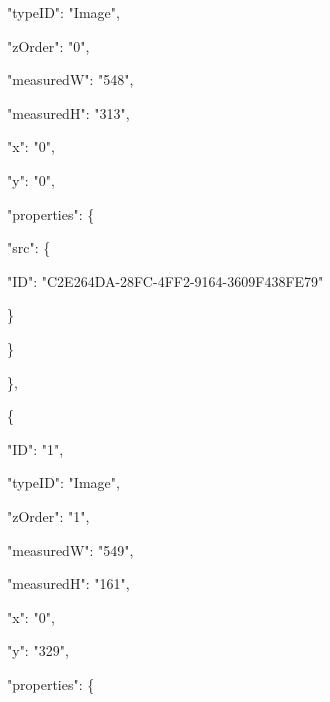 \documentclass[13pt]{article}
\begin{document}
{\raggedright
{\footnotesize                                     "typeID": "Image",}
}

{\raggedright
{\footnotesize                                     "zOrder": "0",}
}

{\raggedright
{\footnotesize                                     "measuredW": "548",}
}

{\raggedright
{\footnotesize                                     "measuredH": "313",}
}

{\raggedright
{\footnotesize                                     "x": "0",}
}

{\raggedright
{\footnotesize                                     "y": "0",}
}

{\raggedright
{\footnotesize                                     "properties": \{}
}

{\raggedright
{\footnotesize                                         "src": \{}
}

{\raggedright
{\footnotesize                                             "ID":
"C2E264DA-28FC-4FF2-9164-3609F438FE79"}
}

{\raggedright
{\footnotesize                                         \}}
}

{\raggedright
{\footnotesize                                     \}}
}

{\raggedright
{\footnotesize                                 \},}
}

{\raggedright
{\footnotesize                                 \{}
}

{\raggedright
{\footnotesize                                     "ID": "1",}
}

{\raggedright
{\footnotesize                                     "typeID": "Image",}
}

{\raggedright
{\footnotesize                                     "zOrder": "1",}
}

{\raggedright
{\footnotesize                                     "measuredW": "549",}
}

{\raggedright
{\footnotesize                                     "measuredH": "161",}
}

{\raggedright
{\footnotesize                                     "x": "0",}
}

{\raggedright
{\footnotesize                                     "y": "329",}
}

{\raggedright
{\footnotesize                                     "properties": \{}
}
\end{document}

